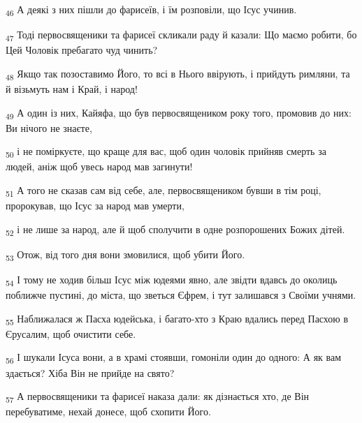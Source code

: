 \begin{tcolorbox}
\textsubscript{46} А деякі з них пішли до фарисеїв, і їм розповіли, що Ісус учинив.
\end{tcolorbox}
\begin{tcolorbox}
\textsubscript{47} Тоді первосвященики та фарисеї скликали раду й казали: Що маємо робити, бо Цей Чоловік пребагато чуд чинить?
\end{tcolorbox}
\begin{tcolorbox}
\textsubscript{48} Якщо так позоставимо Його, то всі в Нього ввірують, і прийдуть римляни, та й візьмуть нам і Край, і народ!
\end{tcolorbox}
\begin{tcolorbox}
\textsubscript{49} А один із них, Кайяфа, що був первосвящеником року того, промовив до них: Ви нічого не знаєте,
\end{tcolorbox}
\begin{tcolorbox}
\textsubscript{50} і не поміркуєте, що краще для вас, щоб один чоловік прийняв смерть за людей, аніж щоб увесь народ мав загинути!
\end{tcolorbox}
\begin{tcolorbox}
\textsubscript{51} А того не сказав сам від себе, але, первосвящеником бувши в тім році, пророкував, що Ісус за народ мав умерти,
\end{tcolorbox}
\begin{tcolorbox}
\textsubscript{52} і не лише за народ, але й щоб сполучити в одне розпорошених Божих дітей.
\end{tcolorbox}
\begin{tcolorbox}
\textsubscript{53} Отож, від того дня вони змовилися, щоб убити Його.
\end{tcolorbox}
\begin{tcolorbox}
\textsubscript{54} І тому не ходив більш Ісус між юдеями явно, але звідти вдавсь до околиць поближче пустині, до міста, що зветься Єфрем, і тут залишався з Своїми учнями.
\end{tcolorbox}
\begin{tcolorbox}
\textsubscript{55} Наближалася ж Пасха юдейська, і багато-хто з Краю вдались перед Пасхою в Єрусалим, щоб очистити себе.
\end{tcolorbox}
\begin{tcolorbox}
\textsubscript{56} І шукали Ісуса вони, а в храмі стоявши, гомоніли один до одного: А як вам здається? Хіба Він не прийде на свято?
\end{tcolorbox}
\begin{tcolorbox}
\textsubscript{57} А первосвященики та фарисеї наказа дали: як дізнається хто, де Він перебуватиме, нехай донесе, щоб схопити Його.
\end{tcolorbox}
